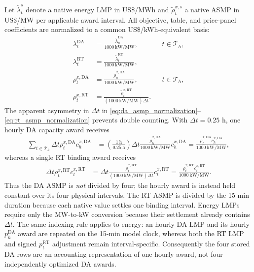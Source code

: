 \documentclass[final,5p,times]{elsarticle}
\newcommand{\dt}{\Delta t}
\newcommand{\DA}{\mathrm{DA}}
\newcommand{\RT}{\mathrm{RT}}
\newcommand{\calT}{\mathcal{T}}
\begin{document}
Let $\widetilde\lambda_t^s$ denote a native energy LMP in US\$/MWh and
$\widetilde\rho_t^{x,s}$ a native ASMP in US\$/MW per applicable award
interval. All objective, table, and price-panel coefficients are normalized to
a common US\$/kWh-equivalent basis:
\begin{align}
\lambda_t^{\DA}&=\frac{\widetilde\lambda_h^{\DA}}{1000~\mathrm{kW/MW}},
&&t\in\calT_h,\\
\lambda_t^{\RT}&=\frac{\widetilde\lambda_t^{\RT}}{1000~\mathrm{kW/MW}},
&& \label{eq:lmp_normalization}\\
\rho_t^{x,\DA}&=\frac{\widetilde\rho_h^{x,\DA}}{1000~\mathrm{kW/MW}},
&&t\in\calT_h, \label{eq:da_asmp_normalization}\\
\rho_t^{x,\RT}&=\frac{\widetilde\rho_t^{x,\RT}}
{(1000~\mathrm{kW/MW})\dt}.
&& \label{eq:rt_asmp_normalization}
\end{align}
The apparent asymmetry in $\Delta t$ in \eqref{eq:da_asmp_normalization}--
\eqref{eq:rt_asmp_normalization} prevents double counting. With $\dt=0.25$ h,
one hourly DA capacity award receives
\begin{align}
\sum_{t\in\calT_h}\dt\rho_t^{x,\DA}c_h^{x,\DA}
&=\left(\frac{1~\mathrm{h}}{0.25~\mathrm{h}}\right)\dt
\frac{\widetilde\rho_h^{x,\DA}}{1000~\mathrm{kW/MW}}c_h^{x,\DA}
=\frac{\widetilde\rho_h^{x,\DA}c_h^{x,\DA}}{1000~\mathrm{kW/MW}},
\label{eq:da_capacity_payment_check}
\end{align}
whereas a single RT binding award receives
\begin{align}
\dt\rho_t^{x,\RT}c_t^{x,\RT}
&=\dt\frac{\widetilde\rho_t^{x,\RT}}
{(1000~\mathrm{kW/MW})\dt}c_t^{x,\RT}
=\frac{\widetilde\rho_t^{x,\RT}c_t^{x,\RT}}{1000~\mathrm{kW/MW}}.
\label{eq:rt_capacity_payment_check}
\end{align}
Thus the DA ASMP is \emph{not} divided by four; the hourly award is instead
held constant over its four physical intervals. The RT ASMP is divided by the
15-min duration because each native value settles one binding interval. Energy
LMPs require only the MW-to-kW conversion because their settlement already
contains $\dt$. The same indexing rule applies to energy: an hourly DA LMP and
its hourly $p_h^{\DA}$ award are repeated on the 15-min model clock, whereas
both the RT LMP and signed $p_t^{\RT}$ adjustment remain interval-specific.
Consequently the four stored DA rows are an accounting representation of one
hourly award, not four independently optimized DA awards.
\end{document}
